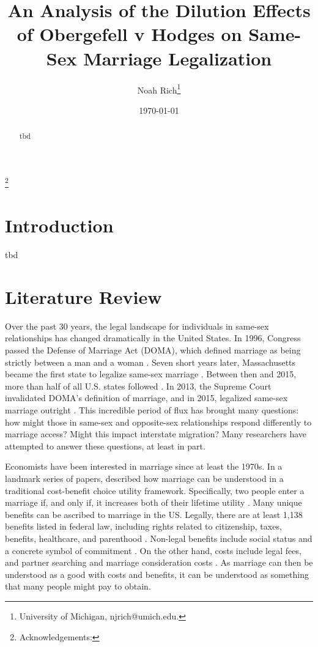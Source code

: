 \documentclass[12pt,letterpaper]{article}
\title{An Analysis of the Dilution Effects of Obergefell v Hodges on Same-Sex Marriage Legalization}
\author{Noah Rich\footnote{University of Michigan, njrich@umich.edu.}}
\date{\today}
\begin{document}
\maketitle
\footnote{Acknowledgements:}

\begin{abstract}
    tbd
\end{abstract}

\newpage

\section{Introduction}

tbd

\section{Literature Review}
Over the past 30 years, the legal landscape for individuals in same-sex relationships has changed dramatically in the United States. In 1996, Congress passed the Defense of Marriage Act (DOMA), which defined marriage as being strictly between a man and a woman \citep{5}. Seven short years later, Massachusetts became the first state to legalize same-sex marriage \citep{1, 3, 5}. Between then and 2015, more than half of all U.S. states followed \citep{12}. In 2013, the Supreme Court invalidated DOMA’s definition of marriage, and in 2015, legalized same-sex marriage outright \citep{1, 3, 5, 12}. This incredible period of flux has brought many questions: how might those in same-sex and opposite-sex relationships respond differently to marriage access? Might this impact interstate migration? Many researchers have attempted to answer these questions, at least in part.

Economists have been interested in marriage since at least the 1970s. In a landmark series of papers, \citet{9} described how marriage can be understood in a traditional cost-benefit choice utility framework. Specifically, two people enter a marriage if, and only if, it increases both of their lifetime utility \citep{9}. Many unique benefits can be ascribed to marriage in the US. Legally, there are at least 1,138 benefits listed in federal law, including rights related to citizenship, taxes, benefits, healthcare, and parenthood \citep{1, 8}. Non-legal benefits include social status and a concrete symbol of commitment \citep{8}. On the other hand, costs include legal fees, and partner searching and marriage consideration costs \citep{9}. As marriage can then be understood as a good with costs and benefits, it can be understood as something that many people might pay to obtain. 
\end{document}
